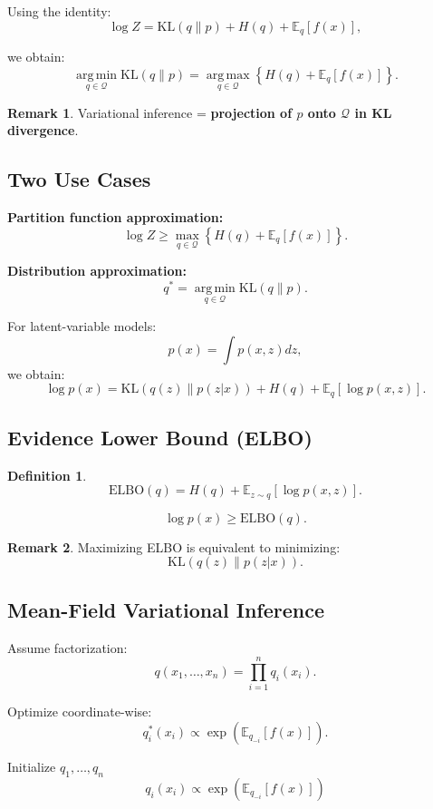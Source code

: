\documentclass[12pt,oneside]{book}
\numberwithin{equation}{section}
\theoremstyle{definition}
\newtheorem{definition}{Definition}[section]
\newtheorem{remark}{Remark}[section]
\theoremstyle{plain}
\theoremstyle{remark}
\newcommand{\E}{\mathbb{E}}
\newcommand{\argmin}{\operatorname*{arg\,min}}
\newcommand{\argmax}{\operatorname*{arg\,max}}
\begin{document}
Using the identity:
\[
\log Z = \mathrm{KL}(q \| p) + H(q) + \E_q[f(x)],
\]

we obtain:
\[
\argmin_{q \in \mathcal{Q}} \mathrm{KL}(q \| p)
=
\argmax_{q \in \mathcal{Q}} \left\{ H(q) + \E_q[f(x)] \right\}.
\]

\begin{remark}
Variational inference = \textbf{projection of $p$ onto $\mathcal{Q}$ in KL divergence}.
\end{remark}

\subsection{Two Use Cases}

\textbf{Partition function approximation:}
\[
\log Z \ge \max_{q \in \mathcal{Q}} \left\{ H(q) + \E_q[f(x)] \right\}.
\]

\textbf{Distribution approximation:}
\[
q^* = \argmin_{q \in \mathcal{Q}} \mathrm{KL}(q \| p).
\]

For latent-variable models:
\[
p(x) = \int p(x,z) dz,
\]
we obtain:
\[
\log p(x)
=
\mathrm{KL}(q(z) \| p(z|x))
+
H(q) + \E_q[\log p(x,z)].
\]

\subsection{Evidence Lower Bound (ELBO)}

\begin{definition}
\[
\mathrm{ELBO}(q)
=
H(q) + \E_{z \sim q}[\log p(x,z)].
\]
\end{definition}

\[
\log p(x) \ge \mathrm{ELBO}(q).
\]

\begin{remark}
Maximizing ELBO is equivalent to minimizing:
\[
\mathrm{KL}(q(z) \| p(z|x)).
\]
\end{remark}

\subsection{Mean-Field Variational Inference}

Assume factorization:
\[
q(x_1,\dots,x_n) = \prod_{i=1}^n q_i(x_i).
\]

Optimize coordinate-wise:
\[
q_i^*(x_i)
\propto
\exp\left( \E_{q_{-i}}[f(x)] \right).
\]

\begin{algorithm}[H]
\caption{Coordinate Ascent Variational Inference (CAVI)}
\begin{algorithmic}[1]
\State Initialize $q_1,\dots,q_n$
\Repeat
        \State
        \[
        q_i(x_i) \propto \exp\left( \E_{q_{-i}}[f(x)] \right)
        \]
    \EndFor
{}
\end{algorithmic}
\end{algorithm}
\end{document}
